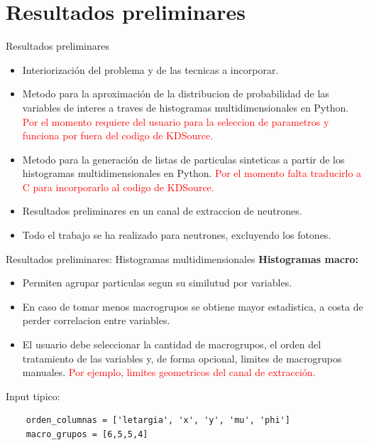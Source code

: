 \documentclass[aspectratio=169,english]{beamer}
\begin{document}
\section{Resultados preliminares}
\begin{frame}{Resultados preliminares}
    \begin{itemize}
        \item Interiorización del problema y de las tecnicas a incorporar.
        \item Metodo para la aproximación de la distribucion de probabilidad de las variables de interes a traves de histogramas multidimensionales en Python. \textcolor{red}{Por el momento requiere del usuario para la seleccion de parametros y funciona por fuera del codigo de KDSource.}
        \item Metodo para la generación de listas de particulas sinteticas a partir de los histogramas multidimensionales en Python. \textcolor{red}{Por el momento falta traducirlo a C para incorporarlo al codigo de KDSource.}
        \item Resultados preliminares en un canal de extraccion de neutrones.
        \item Todo el trabajo se ha realizado para neutrones, excluyendo los fotones.
    \end{itemize}

\end{frame}

\begin{frame}[fragile]{Resultados preliminares: Histogramas multidimensionales}
    \textbf{Histogramas macro:}
    \begin{itemize}
        \item Permiten agrupar particulas segun su similutud por variables.
        \item En caso de tomar menos macrogrupos se obtiene mayor estadistica, a costa de perder correlacion entre variables.
        \item El usuario debe seleccionar la cantidad de macrogrupos, el orden del tratamiento de las variables y, de forma opcional, limites de macrogrupos manuales. \textcolor{red}{Por ejemplo, limites geometricos del canal de extracción.}
    \end{itemize} 

    Input tipico:

    \begin{verbatim}
    orden_columnas = ['letargia', 'x', 'y', 'mu', 'phi']
    macro_grupos = [6,5,5,4]
    \end{verbatim}

\end{frame}
\end{document}
